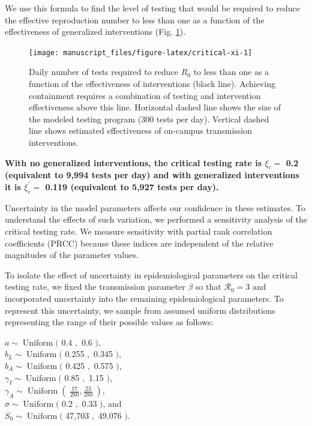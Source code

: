 \documentclass[
]{article}
\begin{document}
We use this formula to find the level of testing that would be required
to reduce the effective reproduction number to less than one as a
function of the effectiveness of generalized interventions (Fig.
\ref{fig:critical-xi}).

\begin{figure}

{\centering \texttt{[image: manuscript\_files/figure-latex/critical-xi-1]} 

}

\caption{\label{fig:critical-xi}Daily number of tests required to reduce $R_0$ to less than one as a function of the effectiveness of interventions (black line). Achieving containment requires a combination of testing and intervention effectiveness above this line. Horizontal dashed line shows the size of the modeled testing program (300 tests per day). Vertical dashed line shows estimated effectiveness of on-campus transmission interventions.}\label{fig:critical-xi}
\end{figure}

\textbf{With no generalized interventions, the critical testing rate is
\(\xi_c =\) 0.2 (equivalent to 9,994 tests per day) and with generalized
interventions it is \(\xi_c^\prime =\) 0.119 (equivalent to 5,927 tests
per day).}

Uncertainty in the model parameters affects our confidence in these
estimates. To understand the effects of such variation, we performed a
sensitivity analysis of the critical testing rate. We measure
sensitivity with partial rank correlation coefficients (PRCC) because
these indices are independent of the relative magnitudes of the
parameter values.

To isolate the effect of uncertainty in epidemiological parameters on
the critical testing rate, we fixed the transmission parameter \(\beta\)
so that \(\mathcal{R}_0=3\) and incorporated uncertainty into the
remaining epidemiological parameters. To represent this uncertainty, we
sample from assumed uniform distributions representing the range of
their possible values as follows:

\(a\sim \operatorname{Uniform}(\) 0.4 \(,\) 0.6 \()\),\\
\(b_L\sim \operatorname{Uniform}(\) 0.255 \(,\) 0.345 \()\),\\
\(b_A\sim \operatorname{Uniform}(\) 0.425 \(,\) 0.575 \()\),\\
\(\gamma_I\sim \operatorname{Uniform}(\) 0.85 \(,\) 1.15 \()\),\\
\(\gamma_A\sim \operatorname{Uniform}(~\frac{17}{280},\frac{23}{280}~)\),\\
\(\sigma\sim \operatorname{Uniform}(\) 0.2 \(,\) 0.33 \()\), and\\
\(S_0\sim \operatorname{Uniform}(\) 47,703 \(,\) 49,076 \()\).
\end{document}
